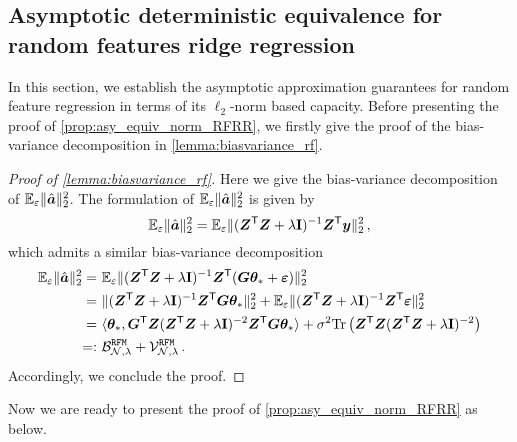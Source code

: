 \subsection{Asymptotic deterministic equivalence for random features ridge regression}
\label{app:asy_deter_equiv_rf}

In this section, we establish the asymptotic approximation guarantees for random feature regression in terms of its $\ell_2$-norm based capacity. Before presenting the proof of \cref{prop:asy_equiv_norm_RFRR}, we firstly give the proof of the bias-variance decomposition in \cref{lemma:biasvariance_rf}.

\begin{proof}[Proof of \cref{lemma:biasvariance_rf}]
Here we give the bias-variance decomposition of $\mathbb{E}_{\varepsilon}\|\hat{{\boldsymbol a}}\|_2^2$. The formulation of $\mathbb{E}_{\varepsilon}\|\hat{{\boldsymbol a}}\|_2^2$ is given by
\[
\mathbb{E}_{\varepsilon}\|\hat{{\boldsymbol a}}\|_2^2 = \mathbb{E}_{\varepsilon} \|({\boldsymbol Z}^{\mathsf T} {\boldsymbol Z} + \lambda {\mathbf I})^{-1} {\boldsymbol Z}^{\mathsf T} {\boldsymbol y}\|_2^2\,,
\]
which admits a similar bias-variance decomposition
\[
\begin{aligned}
    \mathbb{E}_{\varepsilon}\|\hat{{\boldsymbol a}}\|_2^2 =&~ \mathbb{E}_{\varepsilon}\|({\boldsymbol Z}^{\mathsf T} {\boldsymbol Z} + \lambda {\mathbf I})^{-1} {\boldsymbol Z}^{\mathsf T} ({\boldsymbol G} {\boldsymbol \theta}_*+\bm\varepsilon)\|_2^2\\
    =&~ \|({\boldsymbol Z}^{\mathsf T} {\boldsymbol Z} + \lambda {\mathbf I})^{-1} {\boldsymbol Z}^{\mathsf T} {\boldsymbol G} {\boldsymbol \theta}_*\|_2^2 + \mathbb{E}_{\varepsilon}\|({\boldsymbol Z}^{\mathsf T} {\boldsymbol Z} + \lambda {\mathbf I})^{-1} {\boldsymbol Z}^{\mathsf T} \bm\varepsilon\|_2^2\\
    =&~ \langle{\boldsymbol \theta}_*, {\boldsymbol G}^{\mathsf T} {\boldsymbol Z} ({\boldsymbol Z}^{\mathsf T} {\boldsymbol Z} + \lambda{\mathbf I})^{-2} {\boldsymbol Z}^{\mathsf T} {\boldsymbol G}{\boldsymbol \theta}_* \rangle + \sigma^2{\rm Tr}\left({\boldsymbol Z}^{\mathsf T} {\boldsymbol Z}({\boldsymbol Z}^{\mathsf T} {\boldsymbol Z} + \lambda{\mathbf I})^{-2}\right)\\
    =:&~ \mathcal{B}_{\mathcal{N},\lambda}^{\tt RFM} + \mathcal{V}_{\mathcal{N},\lambda}^{\tt RFM}\,.
\end{aligned}
\]
Accordingly, we conclude the proof.
\end{proof}

Now we are ready to present the proof of \cref{prop:asy_equiv_norm_RFRR} as below.

